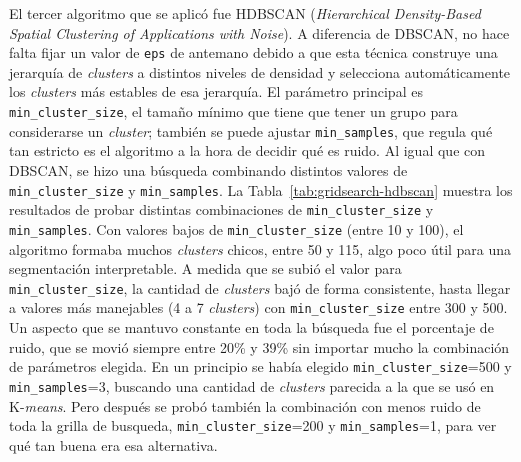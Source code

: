 \documentclass[a4paper,10pts,openany]{book}
\begin{document}
	El tercer algoritmo que se aplicó fue HDBSCAN (\emph{Hierarchical Density-Based Spatial Clustering of Applications with Noise}). A diferencia de DBSCAN, no hace falta fijar un valor de \texttt{eps} de antemano debido a que esta técnica construye una jerarquía de \emph{clusters} a distintos niveles de densidad y selecciona automáticamente los \emph{clusters} más estables de esa jerarquía. El parámetro principal es \texttt{min\_cluster\_size}, el tamaño mínimo que tiene que tener un grupo para considerarse un \emph{cluster}; también se puede ajustar \texttt{min\_samples}, que regula qué tan estricto es el algoritmo a la hora de decidir qué es ruido. 
	Al igual que con DBSCAN, se hizo una búsqueda combinando distintos valores de \texttt{min\_cluster\_size} y \texttt{min\_samples}. La Tabla~\ref{tab:gridsearch-hdbscan} muestra los resultados de probar distintas combinaciones de \texttt{min\_cluster\_size} y \texttt{min\_samples}. Con valores bajos de \texttt{min\_cluster\_size} (entre 10 y 100), el algoritmo formaba muchos \emph{clusters} chicos, entre 50 y 115, algo poco útil para una segmentación interpretable. A medida que se subió el valor para  \texttt{min\_cluster\_size}, la cantidad de \emph{clusters} bajó de forma consistente, hasta llegar a valores más manejables (4 a 7 \emph{clusters}) con \texttt{min\_cluster\_size} entre 300 y 500. Un aspecto que se mantuvo constante en toda la búsqueda fue el porcentaje de ruido, que se movió siempre entre 20\% y 39\% sin importar mucho la combinación de parámetros elegida. En un principio se había elegido \texttt{min\_cluster\_size}=500 y \texttt{min\_samples}=3, buscando una cantidad de \emph{clusters} parecida a la que se usó en K-\emph{means}. Pero después se probó también la combinación con menos ruido de toda la grilla de busqueda, \texttt{min\_cluster\_size}=200 y \texttt{min\_samples}=1, para ver qué tan buena era esa alternativa.
	
\end{document}
